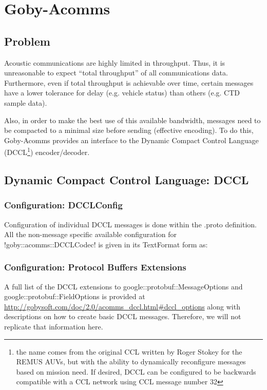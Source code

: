 \chapter{Goby-Acomms}\label{chap:acomms}
\MakeShortVerb{\!} %


\section{Problem}
Acoustic communications are highly limited in throughput. Thus, it is unreasonable to expect ``total throughput'' of all communications data. Furthermore, even if total throughput is achievable over time, certain messages have a lower tolerance for delay (e.g. vehicle status) than others (e.g. CTD sample data). 

Also, in order to make the best use of this available bandwidth, messages need to be compacted to a minimal size before sending (effective encoding). To do this, Goby-Acomms provides an interface to the Dynamic Compact Control Language (DCCL\footnote{the name comes from the original CCL written by Roger Stokey for the REMUS AUVs, but with the ability to dynamically reconfigure messages based on mission need. If desired, DCCL can be configured to be backwards compatible with a CCL network using CCL message number 32}) encoder/decoder. 

\section{Dynamic Compact Control Language: DCCL} \label{sec:dccl}

\subsection{Configuration: DCCLConfig}

Configuration of individual DCCL messages is done within the .proto definition. All the non-message specific available configuration for !goby::acomms::DCCLCodec! is given in its TextFormat form as:

\resetbvlinenumber

\subsection{Configuration: Protocol Buffers Extensions}

A full list of the DCCL extensions to google::protobuf::MessageOptions and google::protobuf::FieldOptions is provided at \url{http://gobysoft.com/doc/2.0/acomms_dccl.html#dccl_options} along with descriptions on how to create basic DCCL messages. Therefore, we will not replicate that information here.

